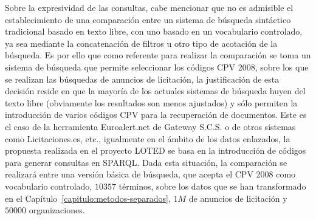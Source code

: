 \begin{enumerate}
Sobre la expresividad de las consultas, cabe mencionar que no es admisible el establecimiento de una comparación entre un sistema de búsqueda sintáctico 
tradicional basado en texto libre, con uno basado en un vocabulario controlado, ya sea mediante la concatenación de filtros u otro tipo 
de acotación de la búsqueda. Es por ello que como referente para realizar la comparación se toma un sistema de búsqueda que permite 
seleccionar los códigos \gls{CPV} 2008, sobre los que se realizan las búsquedas de anuncios de licitación, la justificación de esta decisión reside 
en que la mayoría de los actuales sistemas de búsqueda huyen del texto libre (obviamente los resultados son menos ajustados) y sólo 
permiten la introducción de varios códigos CPV para la recuperación de documentos. Este es el caso de la herramienta Euroalert.net de Gateway S.C.S. 
o de otros sistemas como Licitaciones.es, etc., igualmente en el ámbito de los datos enlazados, la propuesta realizada en el proyecto LOTED 
se basa en la introducción de códigos para generar consultas en \gls{SPARQL}. Dada esta situación, la comparación se realizará entre una versión 
básica de búsqueda, que acepta el CPV 2008 como vocabulario controlado, $10357$ términos, sobre los datos que se han transformado en el Capítulo~\ref{capitulo:metodos-separados}, 
$1M$ de anuncios de licitación y $50000$ organizaciones.


\end{enumerate}
